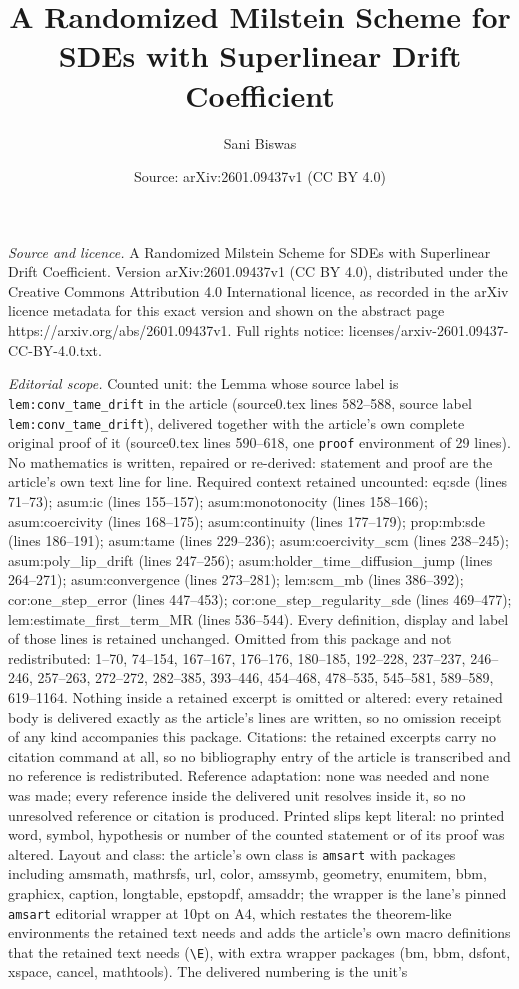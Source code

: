 \documentclass[10pt,a4paper]{amsart}
\title[A Randomized Milstein Scheme for SDEs with Superlinear Drift]{A Randomized Milstein Scheme for SDEs with Superlinear Drift Coefficient}
\author{Sani Biswas}
\date{Source: arXiv:2601.09437v1 (CC BY 4.0)}
\begin{document}
\maketitle

\noindent\emph{Source and licence.} A Randomized Milstein Scheme for SDEs with Superlinear Drift Coefficient. Version arXiv:2601.09437v1 (CC BY 4.0), distributed under the Creative Commons Attribution 4.0 International licence, as recorded in the arXiv licence metadata for this exact version and shown on the abstract page https://arxiv.org/abs/2601.09437v1. Full rights notice: licenses/arxiv-2601.09437-CC-BY-4.0.txt.\par\smallskip

\noindent\textit{Editorial scope.} Counted unit: the Lemma whose source label is \texttt{lem:conv\_tame\_drift} in the article (source0.tex lines 582--588, source label \texttt{lem:conv\_tame\_drift}), delivered together with the article's own complete original proof of it (source0.tex lines 590--618, one \texttt{proof} environment of 29 lines). No mathematics is written, repaired or re-derived: statement and proof are the article's own text line for line. Required context retained uncounted: eq:sde (lines 71--73); asum:ic (lines 155--157); asum:monotonocity (lines 158--166); asum:coercivity (lines 168--175); asum:continuity (lines 177--179); prop:mb:sde (lines 186--191); asum:tame (lines 229--236); asum:coercivity\_scm (lines 238--245); asum:poly\_lip\_drift (lines 247--256); asum:holder\_time\_diffusion\_jump (lines 264--271); asum:convergence (lines 273--281); lem:scm\_mb (lines 386--392); cor:one\_step\_error (lines 447--453); cor:one\_step\_regularity\_sde (lines 469--477); lem:estimate\_first\_term\_MR (lines 536--544). Every definition, display and label of those lines is retained unchanged. Omitted from this package and not redistributed: 1--70, 74--154, 167--167, 176--176, 180--185, 192--228, 237--237, 246--246, 257--263, 272--272, 282--385, 393--446, 454--468, 478--535, 545--581, 589--589, 619--1164. Nothing inside a retained excerpt is omitted or altered: every retained body is delivered exactly as the article's lines are written, so no omission receipt of any kind accompanies this package. Citations: the retained excerpts carry no citation command at all, so no bibliography entry of the article is transcribed and no reference is redistributed. Reference adaptation: none was needed and none was made; every reference inside the delivered unit resolves inside it, so no unresolved reference or citation is produced. Printed slips kept literal: no printed word, symbol, hypothesis or number of the counted statement or of its proof was altered. Layout and class: the article's own class is \texttt{amsart} with packages including amsmath, mathrsfs, url, color, amssymb, geometry, enumitem, bbm, graphicx, caption, longtable, epstopdf, amsaddr; the wrapper is the lane's pinned \texttt{amsart} editorial wrapper at 10pt on A4, which restates the theorem-like environments the retained text needs and adds the article's own macro definitions that the retained text needs (\texttt{\textbackslash E}), with extra wrapper packages (bm, bbm, dsfont, xspace, cancel, mathtools). The delivered numbering is the unit's 
\end{document}
